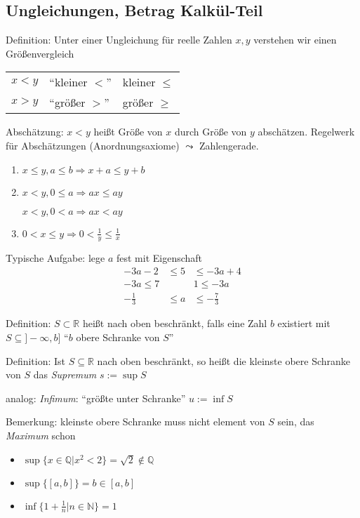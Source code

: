 
\subsection{Ungleichungen,  Betrag Kalkül-Teil}
Definition: Unter einer Ungleichung für reelle Zahlen $x,y$ verstehen wir einen Größenvergleich
\begin{center}
\begin{tabular}{lll}
$x<y$ & ``kleiner $<$'' & kleiner $\leq$ \\ 
$x>y$ & ``größer $>$'' & größer $\geq$
\end{tabular}
\end{center}

Abschätzung: $x<y$ heißt Größe von $x$ durch Größe von $y$ abschätzen. Regelwerk für Abschätzungen (Anordnungsaxiome)
$\leadsto$ Zahlengerade.
\begin{enumerate}
 \item $x \leq y, a\leq b \Rightarrow x+a \leq y+b$
 \item $x<y, 0 \leq a \Rightarrow ax \leq ay$
 
$x<y, 0 < a \Rightarrow ax < ay$
 \item $0<x\leq y \Rightarrow 0 < \frac{1}{y} \leq \frac{1}{x}$
\end{enumerate}
Typische Aufgabe:
lege $a$ fest mit Eigenschaft
\begin{align*}
-3a-2 &\leq 5 &\leq -3a+4 \\
-3a\leq 7 & & 1 \leq -3a \\
-\frac{1}{3} &\leq a &\leq -\frac{7}{3}
\end{align*}

Definition: $S \subset \mathbb{R}$ heißt nach oben beschränkt, falls eine Zahl $b$ existiert mit $S\subseteq ]-\infty,b]$ ``$b$ obere Schranke von $S$''

Definition: Ist $S \subseteq \mathbb{R}$ nach oben beschränkt, so heißt die kleinste obere Schranke von $S$ das \emph{Supremum} $s:=\sup S$

analog: \emph{Infimum}: ``größte unter Schranke'' $u := \inf S$

Bemerkung: kleinste obere Schranke muss nicht element von $S$ sein, das \emph{Maximum} schon

\begin{itemize}
 \item $\sup \{x \in \mathbb{Q} | x^2 < 2 \} = \sqrt{2} \notin \mathbb{Q}$
 \item $\sup \{[a,b]\} = b \in [a,b]$
 \item $\inf \{ 1+\frac{1}{n}|n\in \mathbb{N}\} = 1$
\end{itemize}

